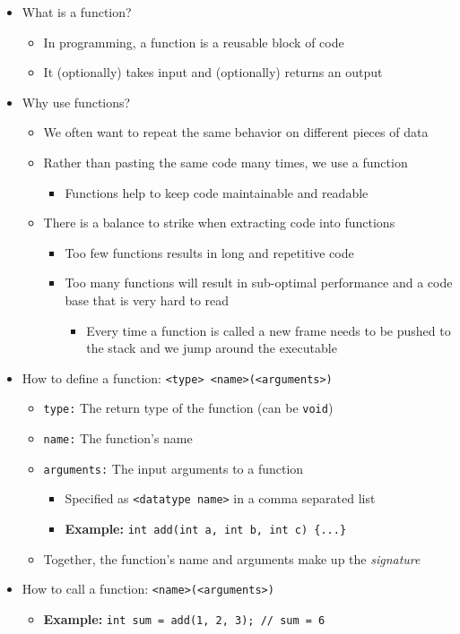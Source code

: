 \documentclass{article}
\begin{document}
\begin{itemize}
	\item What is a function?
	\begin{itemize}
		\item In programming, a function is a reusable block of code
		\item It (optionally) takes input and (optionally) returns an output
	\end{itemize}
	\item Why use functions?
	\begin{itemize}
		\item We often want to repeat the same behavior on different pieces of data
		\item Rather than pasting the same code many times, we use a function
		\begin{itemize}
			\item Functions help to keep code maintainable and readable
		\end{itemize}
		\item There is a balance to strike when extracting code into functions
		\begin{itemize}
			\item Too few functions results in long and repetitive code
			\item Too many functions will result in sub-optimal performance and a code base that is very hard to read \begin{itemize}
				\item Every time a function is called a new frame needs to be pushed to the stack and we jump around the executable
			\end{itemize}
		\end{itemize}
	\end{itemize}
	\item How to define a function: \texttt{<type> <name>(<arguments>)}
	\begin{itemize}
		\item \texttt{type:} The return type of the function (can be \texttt{void})
		\item \texttt{name:} The function's name
		\item \texttt{arguments:} The input arguments to a function
		\begin{itemize}
			\item Specified as \texttt{<datatype name>} in a comma separated list
			\item \textbf{Example:} \texttt{int add(int a, int b, int c) \{...\}}
		\end{itemize}
		\item Together, the function's name and arguments make up the \textit{signature}
	\end{itemize}
	\item How to call a function: \texttt{<name>(<arguments>)}
	\begin{itemize}
	\item \textbf{Example:} \texttt{int sum = add(1, 2, 3); // sum = 6}
	\end{itemize}
	
\end{itemize}
\end{document}
